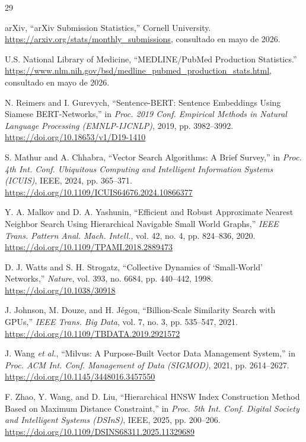 \documentclass[runningheads]{llncs}
\begin{document}
\begin{thebibliography}{29}

arXiv, ``arXiv Submission Statistics,'' Cornell University.\\
\url{https://arxiv.org/stats/monthly_submissions}, consultado en mayo de 2026.

U.S. National Library of Medicine, ``MEDLINE/PubMed Production Statistics.''\\
\url{https://www.nlm.nih.gov/bsd/medline_pubmed_production_stats.html},
consultado en mayo de 2026.

N. Reimers and I. Gurevych, ``Sentence-BERT: Sentence Embeddings Using Siamese
BERT-Networks,'' in \textit{Proc. 2019 Conf. Empirical Methods in Natural Language
Processing (EMNLP-IJCNLP)}, 2019, pp. 3982--3992.\\
\url{https://doi.org/10.18653/v1/D19-1410}

S. Mathur and A. Chhabra, ``Vector Search Algorithms: A Brief Survey,'' in
\textit{Proc. 4th Int. Conf. Ubiquitous Computing and Intelligent Information Systems
(ICUIS)}, IEEE, 2024, pp. 365--371.\\
\url{https://doi.org/10.1109/ICUIS64676.2024.10866377}

Y. A. Malkov and D. A. Yashunin, ``Efficient and Robust Approximate Nearest
Neighbor Search Using Hierarchical Navigable Small World Graphs,'' \textit{IEEE
Trans. Pattern Anal. Mach. Intell.}, vol. 42, no. 4, pp. 824--836, 2020.\\
\url{https://doi.org/10.1109/TPAMI.2018.2889473}

D. J. Watts and S. H. Strogatz, ``Collective Dynamics of `Small-World' Networks,''
\textit{Nature}, vol. 393, no. 6684, pp. 440--442, 1998.\\
\url{https://doi.org/10.1038/30918}

J. Johnson, M. Douze, and H. J\'egou, ``Billion-Scale Similarity Search with
GPUs,'' \textit{IEEE Trans. Big Data}, vol. 7, no. 3, pp. 535--547, 2021.\\
\url{https://doi.org/10.1109/TBDATA.2019.2921572}

J. Wang \textit{et al.}, ``Milvus: A Purpose-Built Vector Data Management System,''
in \textit{Proc. ACM Int. Conf. Management of Data (SIGMOD)}, 2021,
pp. 2614--2627.\\
\url{https://doi.org/10.1145/3448016.3457550}

F. Zhao, Y. Wang, and D. Liu, ``Hierarchical HNSW Index Construction Method Based
on Maximum Distance Constraint,'' in \textit{Proc. 5th Int. Conf. Digital Society
and Intelligent Systems (DSInS)}, IEEE, 2025, pp. 200--206.\\
\url{https://doi.org/10.1109/DSINS68311.2025.11329689}


\end{thebibliography}
\end{document}
